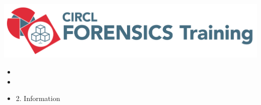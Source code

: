 %
%



\begin{frame}
    \includegraphics[scale=0.3]{images/logo-circl-Forensics.png}
    \begin{itemize}
        \item[]
        \item[]
        \item[] 2. Information
    \end{itemize}
\end{frame}


